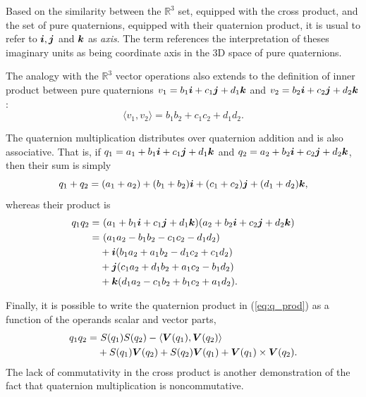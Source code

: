 Based on the similarity between the $ \mathbb{R}^3 $ set, equipped with the cross product, and the set of pure quaternions, equipped with their quaternion product, it is usual to refer to $\boldsymbol{i}, \boldsymbol{j}$ and $\boldsymbol{k}$ as \emph{axis}. The term references the interpretation of theses imaginary units as being coordinate axis in the 3D space of pure quaternions.

The analogy with the $\mathbb{R}^3$ vector operations also extends to the definition of inner product between pure quaternions $v_1 = b_1\boldsymbol{i} + c_1\boldsymbol{j} + d_1\boldsymbol{k}$ and $v_2 = b_2\boldsymbol{i} + c_2\boldsymbol{j} + d_2\boldsymbol{k}$:
\begin{equation}
\langle v_1, v_2 \rangle =
b_1 b_2 + c_1 c_2 + d_1 d_2.
\end{equation}

The quaternion multiplication distributes over quaternion addition
and is also associative. That is, if $q_1 = a_1 + b_1\boldsymbol{i} + c_1\boldsymbol{j} + d_1\boldsymbol{k}$ and $q_2 = a_2 +  b_2\boldsymbol{i} + c_2\boldsymbol{j} + d_2\boldsymbol{k}$, then their sum is simply
\begin{equation}
q_1 + q_2 = (a_1 + a_2) + (b_1 + b_2)\boldsymbol{i} + (c_1 + c_2)\boldsymbol{j} + (d_1 + d_2)\boldsymbol{k},
\end{equation}
whereas their product is
\begin{equation}
\label{eq:q_prod}
\begin{aligned}
q_1 q_2 = &  \ (a_1 + b_1\boldsymbol{i} + c_1\boldsymbol{j} + d_1\boldsymbol{k}) (a_2 +  b_2\boldsymbol{i} + c_2\boldsymbol{j} + d_2\boldsymbol{k})  \\
= & \ (a_1 a_2 - b_1 b_2 - c_1 c_2 - d_1 d_2)  \\
& + \boldsymbol{i} (b_1 a_2 + a_1 b_2 - d_1 c_2 + c_1 d_2)  \\
& + \boldsymbol{j} (c_1 a_2 + d_1 b_2 + a_1 c_2 - b_1 d_2)  \\
& + \boldsymbol{k} (d_1 a_2 - c_1 b_2 + b_1 c_2 + a_1 d_2).
\end{aligned}
\end{equation}

Finally, it is possible to write the quaternion product in (\ref{eq:q_prod}) as a function of the operands scalar and vector parts,
\begin{equation}
\label{eq:prod_vectors}
\begin{aligned}
q_1 q_2 = & \ S(q_1)S(q_2) - \langle\boldsymbol{V}(q_1), \boldsymbol{V}(q_2)\rangle \\
& + S(q_1) \boldsymbol{V}(q_2) + S(q_2)\boldsymbol{V}(q_1) + \boldsymbol{V}(q_1) \times \boldsymbol{V}(q_2).
\end{aligned}
\end{equation}
The lack of commutativity in the cross product is another demonstration of the fact that quaternion multiplication is noncommutative.

